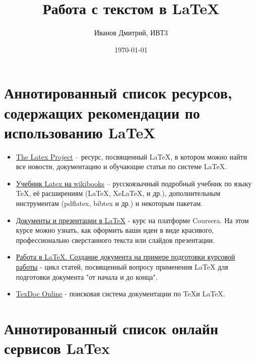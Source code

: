 \documentclass[a4paper,12pt]{article} %
\author{Иванов Дмитрий, ИВТ3}
\title{Работа с текстом в \LaTeX{}}
\date{\today}
\begin{document}
\maketitle
\newpage


\section{Аннотированный список ресурсов, содержащих рекомендации по использованию LaTeX}

\begin{itemize}
\item \href{https://www.latex-project.org/}{The Latex Project} – ресурс, посвященный \LaTeX, в котором можно найти все новости, документацию и обучающие статьи по системе \LaTeX.
\item \href{https://ru.wikibooks.org/wiki/LaTeX}{Учебник Latex на wikibooks} – русскоязычный подробный учебник по языку TeX, её расширениям (LaTeX, XeLaTeX, и др.), дополнительным инструментам (pdflatex, bibtex и др.) и некоторым пакетам.
\item \href{https://www.coursera.org/learn/latex}{Документы и презентации в LaTeX} - курс на платформе Coursera. На этом курсе можно узнать, как оформить ваши идеи в виде красивого, профессионально сверстанного текста или слайдов презентации.
\item \href{https://www.ibm.com/developerworks/ru/library/latex_tutorial_01/index.html}{Работа в LaTeX. Создание документа на примере подготовки курсовой работы} - цикл статей, посвященный вопросу применения LaTeX для подготовки документа "от начала и до конца".
\item \href{http://www.texdoc.net/}{TexDoc Online} - поисковая система документации по \TeX и \LaTeX.
\end{itemize}

\section{Аннотированный список онлайн сервисов LaTex}
\end{document}
